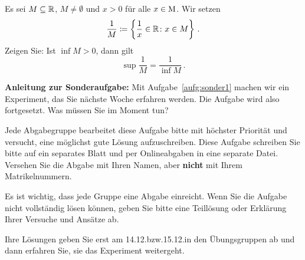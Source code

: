 \bigskip

\begin{lsg}  
\end{lsg}


\bigskip

\begin{aufg}\label{aufg:sonder1}
Es sei $M\subseteq\mathbb{R}$, $M\not=\emptyset$ und $x>0$ f\"ur alle $x\in\operatorname{M}$. Wir setzen
\[
 \frac1M \coloneqq \left\{ \frac1x \in \mathbb{R} \colon x\in M \right\}\,.
\]
Zeigen Sie: Ist $\inf M >0$, dann gilt 
\[
 \sup \frac1M = \frac{1}{\inf M}\,.
\]
\end{aufg}

\bigskip

\begin{lsg}
\end{lsg}

\bigskip


\noindent
\textbf{Anleitung zur Sonderaufgabe:} Mit Aufgabe~\ref{aufg:sonder1} machen wir ein Experiment, das Sie n\"achste Woche erfahren werden. Die Aufgabe wird also fortgesetzt. Was m\"ussen Sie im Moment tun?

Jede Abgabegruppe bearbeitet diese Aufgabe bitte mit h\"ochster Priorit\"at und versucht, eine m\"oglichst gute L\"osung aufzuschreiben. Diese Aufgabe schreiben Sie bitte auf ein separates Blatt und per Onlineabgaben in eine separate Datei. Versehen Sie die Abgabe mit Ihren Namen, aber \textbf{nicht} mit Ihrem Matrikelnummern. 

Es ist wichtig, dass jede Gruppe eine Abgabe einreicht. Wenn Sie die Aufgabe nicht vollst\"andig l\"osen k\"onnen, geben Sie bitte eine Teill\"osung oder Erkl\"arung Ihrer Versuche und Ans\"atze ab.

Ihre L\"osungen geben Sie erst am 14.12.\@ bzw.\@ 15.12.\@ in den \"Ubungsgruppen ab und dann erfahren Sie, sie das Experiment weitergeht.
